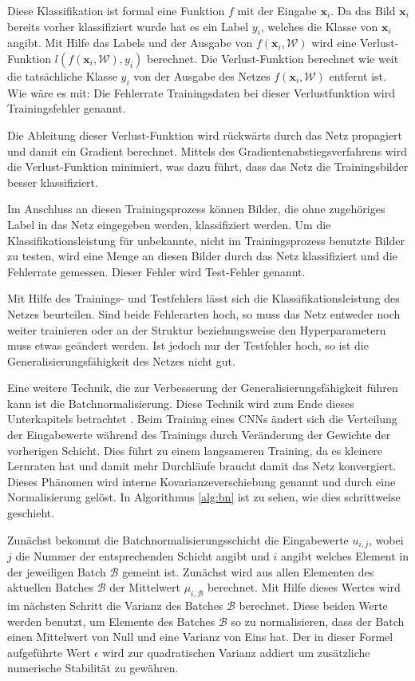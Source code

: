 Diese Klassifikation ist formal eine Funktion $f$ mit der Eingabe $\mathbf{x}_i$. Da das Bild $\mathbf{x}_i$ bereits vorher klassifiziert wurde hat es ein Label $y_i$, welches die Klasse von $\mathbf{x}_i$ angibt. Mit Hilfe das Labels und der Ausgabe von $f(\mathbf{x}_i, \mathcal{W})$ wird eine Verlust-Funktion $l(f(\mathbf{x}_i,\mathcal{W}),y_i)$ berechnet. Die Verlust-Funktion berechnet wie weit die tatsächliche Klasse $y_i$ von der Ausgabe des Netzes $f(\mathbf{x}_i, \mathcal{W})$ entfernt ist. Wie wäre es mit: Die Fehlerrate Trainingsdaten bei dieser Verlustfunktion wird Trainingsfehler genannt.


Die Ableitung dieser Verlust-Funktion wird rückwärts durch das Netz propagiert und damit ein Gradient berechnet. Mittels des Gradientenabstiegsverfahrens wird die Verlust-Funktion minimiert, was dazu führt, dass das Netz die Trainingsbilder besser klassifiziert. 


Im Anschluss an diesen Trainingsprozess können Bilder, die ohne zugehöriges Label in das Netz eingegeben werden, klassifiziert werden. Um die Klassifikationsleistung für unbekannte, nicht im Trainingsprozess benutzte Bilder zu testen, wird eine Menge an diesen Bilder durch das Netz klassifiziert und die Fehlerrate gemessen. Dieser Fehler wird Test-Fehler genannt. 


Mit Hilfe des Trainings- und Testfehlers lässt sich die Klassifikationsleistung des Netzes beurteilen. Sind beide Fehlerarten hoch, so muss das Netz entweder noch weiter trainieren oder an der Struktur beziehungsweise den Hyperparametern muss etwas geändert werden. Ist jedoch nur der Testfehler hoch, so ist die Generalisierungsfähigkeit des Netzes nicht gut. 

Eine weitere Technik, die zur Verbesserung der Generalisierungsfähigkeit führen kann ist die Batchnormalisierung. Diese Technik wird zum Ende dieses Unterkapitels betrachtet \cite{batchnorm}. Beim Training eines CNNs ändert sich die Verteilung der Eingabewerte während des Trainings durch Veränderung der Gewichte der vorherigen Schicht. Dies führt zu einem langsameren Training, da es kleinere Lernraten hat und damit mehr Durchläufe braucht damit das Netz konvergiert. Dieses Phänomen wird interne Kovarianzeverschiebung genannt und durch eine Normalisierung gelöst. In Algorithmus \ref{alg:bn} ist zu sehen, wie dies schrittweise geschieht.


Zunächst bekommt die Batchnormalisierungsschicht die Eingabewerte $u_{i,j}$, wobei $j$ die Nummer der entsprechenden Schicht angibt und $i$ angibt welches Element in der jeweiligen Batch $\mathcal{B}$ gemeint ist. Zunächst wird aus allen Elementen des aktuellen Batches $\mathcal{B}$ der Mittelwert $\mu_{i,\mathcal{B}}$ berechnet. Mit Hilfe dieses Wertes wird im nächsten Schritt die Varianz des Batches $\mathcal{B}$ berechnet. Diese beiden Werte werden benutzt, um Elemente des Batches $\mathcal{B}$ so zu normalisieren, dass der Batch einen Mittelwert von Null und eine Varianz von Eins hat. Der in dieser Formel aufgeführte Wert $\epsilon$ wird zur quadratischen Varianz addiert um zusätzliche numerische Stabilität zu gewähren. 


